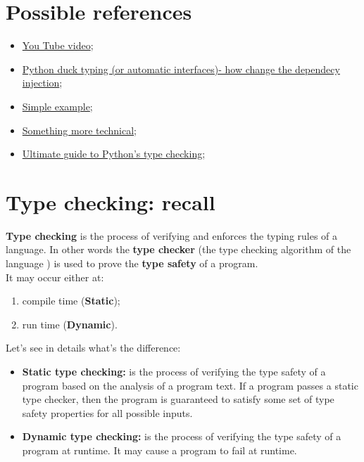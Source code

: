 \documentclass[12pt]{article}
\begin{document}
\maketitle
\tableofcontents
\listoftables
\listoffigures

\section{Possible references}
	\begin{itemize}
		\item \href{https://www.youtube.com/watch?v=fK5lcaNqdj4}{You Tube video};
		\item \href{https://hackernoon.com/python-duck-typing-or-automatic-interfaces-73988ec9037f}{Python duck typing (or automatic interfaces)- how change the dependecy injection};
		\item \href{https://medium.com/programming-hacks/duck-typing-in-python-6740aa72b301}{Simple example};
		\item \href{http://www.voidspace.org.uk/python/articles/duck_typing.shtml}{Something more technical};
		\item 
		\href{https://realpython.com/python-type-checking/}{Ultimate guide to Python's type checking;}
	\end{itemize}
	
\section{Type checking: recall }
	
		\textbf{Type checking} is the process of verifying and enforces the typing rules of a language. In other words the \textbf{type checker} (the type checking algorithm of the language ) is used to prove the \textbf{type safety} of a program.\\
		It may occur either at:
		
		\begin{enumerate}
			\item compile time (\textbf{Static});
			\item run time (\textbf{Dynamic}). 
		\end{enumerate}
	
		Let's see in details what's the difference:	
		
		\begin{itemize}
			\item \textbf{Static type checking: }is the process of verifying the type safety of a program based on the analysis of a program text.  If a program passes a static type checker, then the program is guaranteed to satisfy some set of type safety properties for all possible inputs.
			\item \textbf{Dynamic type checking:} is the process of verifying the type safety of a program at runtime. It may cause a program to fail at runtime.
		\end{itemize}
	
\end{document}
